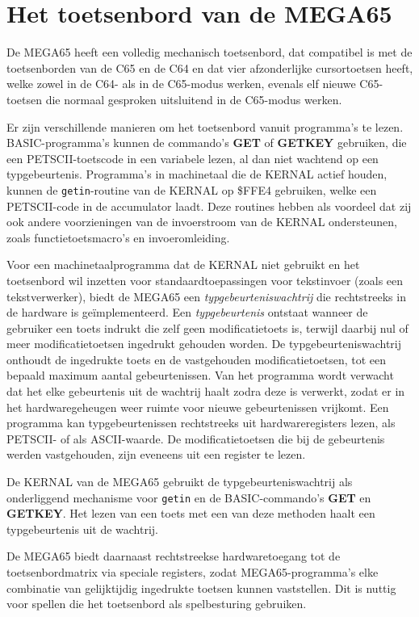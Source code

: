 
\chapter{Het toetsenbord van de MEGA65}
\label{cha:keyboard}

De MEGA65 heeft een volledig mechanisch toetsenbord, dat compatibel is met de toetsenborden van de C65 en de C64 en dat vier afzonderlijke cursortoetsen heeft, welke zowel in de C64- als in de C65-modus werken, evenals elf nieuwe C65-toetsen die normaal gesproken uitsluitend in de C65-modus werken.

Er zijn verschillende manieren om het toetsenbord vanuit programma's te lezen. BASIC-programma's kunnen de commando's {\bf GET} of {\bf GETKEY} gebruiken, die een PETSCII-toetscode in een variabele lezen, al dan niet wachtend op een typgebeurtenis. Programma's in machinetaal die de KERNAL actief houden, kunnen de {\tt getin}-routine van de KERNAL op \$FFE4 gebruiken, welke een PETSCII-code in de accumulator laadt. Deze routines hebben als voordeel dat zij ook andere voorzieningen van de invoerstroom van de KERNAL ondersteunen, zoals functietoetsmacro's en invoeromleiding.

Voor een machinetaalprogramma dat de KERNAL niet gebruikt en het toetsenbord wil inzetten voor standaardtoepassingen voor tekstinvoer (zoals een tekstverwerker), biedt de MEGA65 een {\em typgebeurteniswachtrij} die rechtstreeks in de hardware is geïmplementeerd. Een {\em typgebeurtenis} ontstaat wanneer de gebruiker een toets indrukt die zelf geen modificatietoets is, terwijl daarbij nul of meer modificatietoetsen ingedrukt gehouden worden. De typgebeurteniswachtrij onthoudt de ingedrukte toets en de vastgehouden modificatietoetsen, tot een bepaald maximum aantal gebeurtenissen. Van het programma wordt verwacht dat het elke gebeurtenis uit de wachtrij haalt zodra deze is verwerkt, zodat er in het hardwaregeheugen weer ruimte voor nieuwe gebeurtenissen vrijkomt. Een programma kan typgebeurtenissen rechtstreeks uit hardwareregisters lezen, als PETSCII- of als ASCII-waarde. De modificatietoetsen die bij de gebeurtenis werden vastgehouden, zijn eveneens uit een register te lezen.

De KERNAL van de MEGA65 gebruikt de typgebeurteniswachtrij als onderliggend mechanisme voor {\tt getin} en de BASIC-commando's {\bf GET} en {\bf GETKEY}. Het lezen van een toets met een van deze methoden haalt een typgebeurtenis uit de wachtrij.

De MEGA65 biedt daarnaast rechtstreekse hardwaretoegang tot de toetsenbordmatrix via speciale registers, zodat MEGA65-programma's elke combinatie van gelijktijdig ingedrukte toetsen kunnen vaststellen. Dit is nuttig voor spellen die het toetsenbord als spelbesturing gebruiken.


